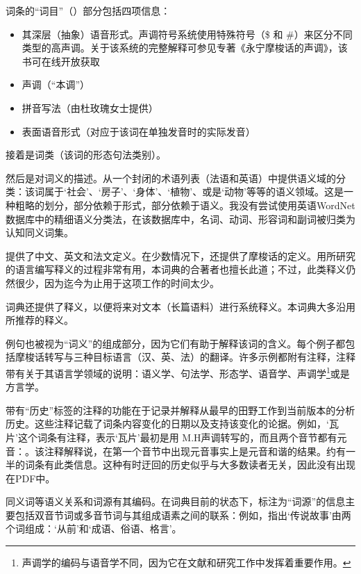 词条的“词目”（）部分包括四项信息：
\begin{itemize}
    \item 其深层（抽象）语音形式。声调符号系统使用特殊符号（\$ 和 \#）来区分不同类型的高声调。关于该系统的完整解释可参见专著《永宁摩梭话的声调》，该书可在线开放获取\parencite[80-90]{michaud2017}
    \item 声调（“本调”）
    \item 拼音写法（由杜玫瑰女士提供）
    \item 表面语音形式（对应于该词在单独发音时的实际发音）
\end{itemize}

接着是词类（该词的形态句法类别）。

然后是对词义的描述。从一个封闭的术语列表（法语和英语）中提供语义域的分类：该词属于‘社会’、‘房子’、‘身体’、‘植物’、或是‘动物’等等的语义领域。这是一种粗略的划分，部分依赖于形式，部分依赖于语义。我没有尝试使用英语WordNet数据库中的精细语义分类法，在该数据库中，名词、动词、形容词和副词被归类为认知同义词集\parencite{fellbaum2005}。

提供了中文、英文和法文定义。在少数情况下，还提供了摩梭话的定义。用所研究的语言编写释义的过程非常有用\parencite{dingemanse_folk_2015}，本词典的合著者也擅长此道；不过，此类释义仍然很少，因为迄今为止用于这项工作的时间太少。

词典还提供了释义，以便将来对文本（长篇语料）进行系统释义。本词典大多沿用\textcite{lidz2010}所推荐的释义。

例句也被视为“词义”的组成部分，因为它们有助于解释该词的含义。每个例子都包括摩梭话转写与三种目标语言（汉、英、法）的翻译。许多示例都附有注释，注释带有关于其语言学领域的说明：语义学、句法学、形态学、语音学、声调学\footnote{声调学的编码与语音学不同，因为它在文献和研究工作中发挥着重要作用。}或是方言学。%

带有“历史”标签的注释的功能在于记录并解释从最早的田野工作到当前版本的分析历史。这些注释记载了词条内容变化的日期以及支持该变化的论据。例如，‘瓦片’这个词条有注释，表示‘瓦片’最初是用 M.H声调转写的，而且两个音节都有元音：。该注释解释说，在第一个音节中出现元音事实上是元音和谐的结果。约有一半的词条有此类信息。这种有时迂回的历史似乎与大多数读者无关，因此没有出现在PDF中。

同义词等语义关系和词源有其编码。在词典目前的状态下，标注为“词源”的信息主要包括双音节词或多音节词与其组成语素之间的联系：例如，指出‘传说故事’由两个词组成：‘从前’和‘成语、俗语、格言’。


